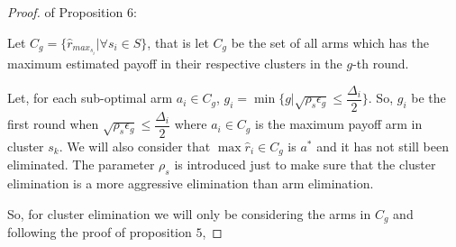 \begin{proof} of Proposition 6:

Let $C_{g}=\lbrace \hat{r}_{max_{s_{i}}}| \forall s_{i}\in S \rbrace$, that is let $C_{g}$ be the set of all arms which has the maximum estimated payoff in their respective clusters in the $g$-th round.

Let, for each sub-optimal arm $a_{i}\in C_{g}$, $g_{i}=\min{\lbrace g|\sqrt{\rho_{s}\epsilon_{g}}\leq \dfrac{\Delta_{i}}{2} \rbrace}$. So, $g_{i}$ be the first round when $\sqrt{\rho_{s}\epsilon_{g}}\leq \dfrac{\Delta_{i}}{2}$ where $a_{i}\in C_{g}$ is the maximum payoff arm in cluster $s_{k}$. We will also consider that $\max \hat{r}_{i}\in C_{g}$ is $a^{*}$ and it has not still been eliminated. The parameter $\rho_{s}$ is introduced just to make sure that the cluster elimination is a more aggressive elimination than arm elimination.

So, for cluster elimination we will only be considering the arms in $C_{g}$ and following the proof of proposition $5$,


\end{proof}
